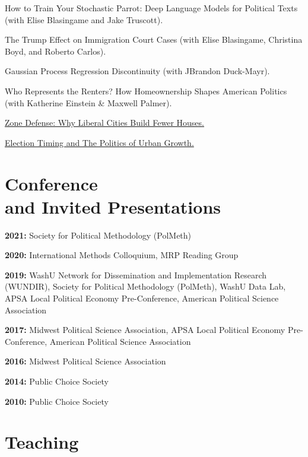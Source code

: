 \documentclass[margin,line]{res}
\newenvironment{publist}{
	\begin{list}{}{%
			\setlength{\itemsep}{0.15in}
			\setlength{\parsep}{0in} \setlength{\parskip}{0in}
			\setlength{\topsep}{0in} \setlength{\partopsep}{0in} 
			\setlength{\leftmargin}{0.15in}
			\setlength{\itemindent}{-0.15in}}}
		{\end{list}}
\begin{document}
\begin{resume}
\begin{publist}
	\item How to Train Your Stochastic Parrot: Deep Language Models for Political Texts (with Elise Blasingame and Jake Truscott).
	\item The Trump Effect on Immigration Court Cases (with Elise Blasingame, Christina Boyd, and Roberto Carlos).
	\item Gaussian Process Regression Discontinuity (with JBrandon Duck-Mayr).
	\item Who Represents the Renters? How Homeownership Shapes American Politics (with Katherine Einstein \& Maxwell Palmer). 
	\item \href{https://joeornstein.github.io/publications/ornstein-zone-defense.pdf}{Zone Defense: Why Liberal Cities Build Fewer Houses.}
	\item \href{https://joeornstein.github.io/publications/Ornstein-ElectionTiming.pdf}{Election Timing and The Politics of Urban Growth.}
\end{publist}

\section{\sc Conference \\and Invited Presentations}

\textbf{2021:} Society for Political Methodology (PolMeth)

\textbf{2020:} International Methods Colloquium, MRP Reading Group

\textbf{2019:} WashU Network for Dissemination and Implementation Research (WUNDIR), Society for Political Methodology (PolMeth), WashU Data Lab, APSA Local Political Economy Pre-Conference, American Political Science Association

\textbf{2017:} Midwest Political Science Association, APSA Local Political Economy Pre-Conference, American Political Science Association

\textbf{2016:} Midwest Political Science Association

\textbf{2014:} Public Choice Society

\textbf{2010:} Public Choice Society


\section{\sc Teaching}



\end{resume}
\end{document}
